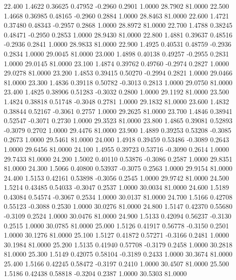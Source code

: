   22.400   1.4622   0.36625   0.47952  -0.2960   0.2901   1.0000  28.7902  81.0000
  22.500   1.4668   0.36985   0.48165  -0.2960   0.2884   1.0000  28.8463  81.0000
  22.600   1.4721   0.37480   0.48343  -0.2957   0.2868   1.0000  28.8972  81.0000
  22.700   1.4788   0.38245   0.48471  -0.2950   0.2853   1.0000  28.9430  81.0000
  22.800   1.4881   0.39637   0.48516  -0.2936   0.2841   1.0000  28.9833  81.0000
  22.900   1.4925   0.40531   0.48759  -0.2936   0.2834   1.0000  29.0045  81.0000
  23.000   1.4898   0.40138   0.49257  -0.2955   0.2831   1.0000  29.0145  81.0000
  23.100   1.4874   0.39762   0.49760  -0.2974   0.2827   1.0000  29.0278  81.0000
  23.200   1.4853   0.39415   0.50270  -0.2994   0.2821   1.0000  29.0466  81.0000
  23.300   1.4836   0.39118   0.50782  -0.3013   0.2813   1.0000  29.0750  81.0000
  23.400   1.4825   0.38906   0.51283  -0.3032   0.2800   1.0000  29.1192  81.0000
  23.500   1.4824   0.38818   0.51748  -0.3048   0.2781   1.0000  29.1832  81.0000
  23.600   1.4832   0.38844   0.52167  -0.3061   0.2757   1.0000  29.2625  81.0000
  23.700   1.4846   0.38941   0.52547  -0.3071   0.2730   1.0000  29.3523  81.0000
  23.800   1.4865   0.39081   0.52893  -0.3079   0.2702   1.0000  29.4476  81.0000
  23.900   1.4889   0.39253   0.53208  -0.3085   0.2673   1.0000  29.5461  81.0000
  24.000   1.4918   0.39459   0.53486  -0.3089   0.2643   1.0000  29.6456  81.0000
  24.100   1.4955   0.39723   0.53716  -0.3090   0.2614   1.0000  29.7433  81.0000
  24.200   1.5002   0.40110   0.53876  -0.3086   0.2587   1.0000  29.8351  81.0000
  24.300   1.5066   0.40800   0.53937  -0.3075   0.2563   1.0000  29.9154  81.0000
  24.400   1.5153   0.42161   0.53898  -0.3056   0.2545   1.0000  29.9742  81.0000
  24.500   1.5214   0.43485   0.54033  -0.3047   0.2537   1.0000  30.0034  81.0000
  24.600   1.5189   0.43084   0.54574  -0.3067   0.2534   1.0000  30.0137  81.0000
  24.700   1.5166   0.42708   0.55123  -0.3088   0.2530   1.0000  30.0276  81.0000
  24.800   1.5147   0.42370   0.55680  -0.3109   0.2524   1.0000  30.0476  81.0000
  24.900   1.5133   0.42094   0.56237  -0.3130   0.2515   1.0000  30.0785  81.0000
  25.000   1.5126   0.41917   0.56778  -0.3150   0.2501   1.0000  30.1276  81.0000
  25.100   1.5127   0.41872   0.57271  -0.3166   0.2481   1.0000  30.1984  81.0000
  25.200   1.5135   0.41940   0.57708  -0.3179   0.2458   1.0000  30.2818  81.0000
  25.300   1.5149   0.42075   0.58104  -0.3189   0.2433   1.0000  30.3674  81.0000
  25.400   1.5166   0.42245   0.58472  -0.3197   0.2410   1.0000  30.4507  81.0000
  25.500   1.5186   0.42438   0.58818  -0.3204   0.2387   1.0000  30.5303  81.0000
